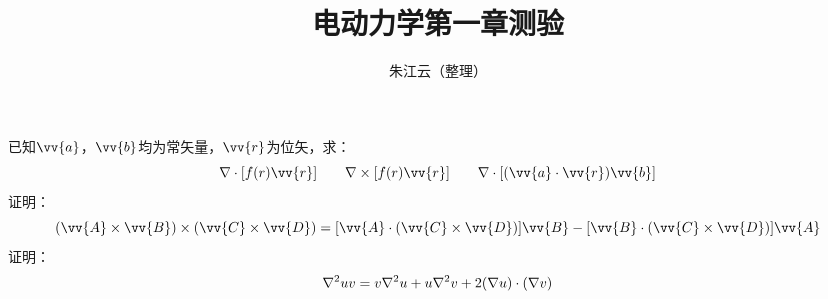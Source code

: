 \documentclass{exam}
\author{朱江云（整理）}
\title{电动力学第一章测验}
\date{}
\begin{document}
\maketitle
\begin{questions}
    \question 已知$\vv{a}$，$\vv{b}$均为常矢量，$\vv{r}$为位矢，求：
    \begin{equation*}
        \nabla \cdot [f(r)\vv{r}] \qquad \nabla \times [f(r)\vv{r}] \qquad \nabla\cdot[(\vv{a}\cdot\vv{r})\vv{b}]
    \end{equation*}
    \question 证明：
    \begin{equation*}
        (\vv{A}\times\vv{B})\times(\vv{C}\times\vv{D})
        =[\vv{A}\cdot(\vv{C}\times\vv{D})]\vv{B}
        -[\vv{B}\cdot(\vv{C}\times\vv{D})]\vv{A}
    \end{equation*}
    \question 证明：
    \begin{equation*}
        \laplacian{uv}=v\laplacian{u}+u\laplacian{v}+2(\nabla u)\cdot(\nabla v)
    \end{equation*}
\end{questions}
\end{document}
